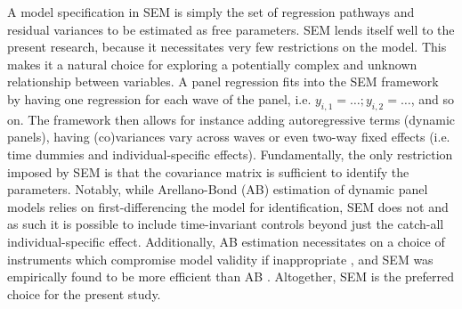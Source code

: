 A model specification in SEM is simply the set of regression pathways and residual variances to be estimated as free
parameters.
SEM lends itself well to the present research, because it necessitates very few restrictions on the model.
This makes it a natural choice for exploring a potentially complex and unknown relationship between variables.
A panel regression fits into the SEM framework by having one regression for each wave of the panel,
i.e. $y_{i,1} = \ldots; y_{i, 2} = \ldots$, and so on. The framework then allows for instance adding autoregressive terms
(dynamic panels), having (co)variances vary across waves or even two-way fixed effects
(i.e. time dummies and individual-specific effects).
Fundamentally, the only restriction imposed by SEM is that the covariance matrix is sufficient to identify the parameters.
Notably, while Arellano-Bond (AB) estimation of dynamic panel models relies on first-differencing the model for identification,
SEM does not and as such it is possible to include time-invariant controls beyond just the catch-all individual-specific effect.
Additionally, AB estimation necessitates on a choice of instruments which compromise model validity if inappropriate
\cite{bazzi2013blunt}, and SEM was empirically found to be more efficient than AB \cite{leszczensky2022deal}.
Altogether, SEM is the preferred choice for the present study.

